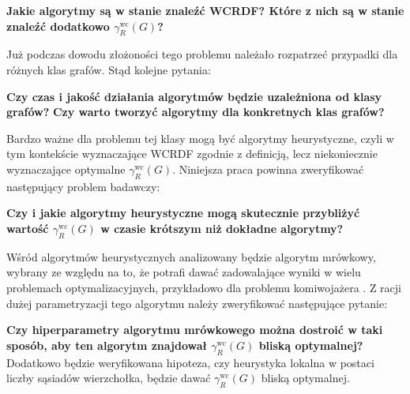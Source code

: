 \textbf{Jakie algorytmy są w stanie znaleźć WCRDF? Które z nich są w stanie znaleźć dodatkowo $\gamma_{R}^{\text{wc}}(G)$?}

Już podczas dowodu złożoności tego problemu należało rozpatrzeć przypadki dla różnych klas grafów. Stąd kolejne pytania:

\textbf{Czy czas i jakość działania algorytmów będzie uzależniona od klasy grafów?}
\textbf{Czy warto tworzyć algorytmy dla konkretnych klas grafów?}

Bardzo ważne dla problemu tej klasy mogą być algorytmy heurystyczne, czyli w tym kontekście wyznaczające WCRDF zgodnie z definicją, lecz niekoniecznie wyznaczające optymalne $\gamma_{R}^{\text{wc}}(G)$. Niniejsza praca powinna zweryfikować następujący problem badawczy:

\textbf{Czy i jakie algorytmy heurystyczne mogą skutecznie przybliżyć wartość $\gamma_{R}^{\text{wc}}(G)$ w czasie krótszym niż dokładne algorytmy?}

Wśród algorytmów heurystycznych analizowany będzie algorytm mrówkowy, wybrany ze względu na to, że potrafi dawać zadowalające wyniki w wielu problemach optymalizacyjnych, przykładowo dla problemu komiwojażera \cite{TRAVEL}. Z racji dużej parametryzacji tego algorytmu należy zweryfikować następujące pytanie:

\textbf{Czy hiperparametry algorytmu mrówkowego można dostroić w taki sposób, aby ten algorytm znajdował $\gamma_{R}^{\text{wc}}(G)$ bliską optymalnej?}\\
Dodatkowo będzie weryfikowana hipoteza, czy heurystyka lokalna w postaci liczby sąsiadów wierzchołka, będzie dawać $\gamma_{R}^{\text{wc}}(G)$ bliską optymalnej.

